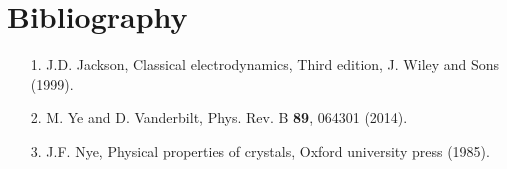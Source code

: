 \documentclass[12pt,a4paper]{article}
\begin{document}
\section{\color{coral}Bibliography}
\begin{enumerate}

\item
[1.] J.D. Jackson, Classical electrodynamics, Third edition,
J. Wiley and Sons (1999).

\item
[2.] M. Ye and D. Vanderbilt, Phys. Rev. B {\bf 89}, 064301 (2014).

\item[3.] J.F. Nye, Physical properties of crystals, Oxford university 
press (1985).
\end{enumerate}
\end{document}
